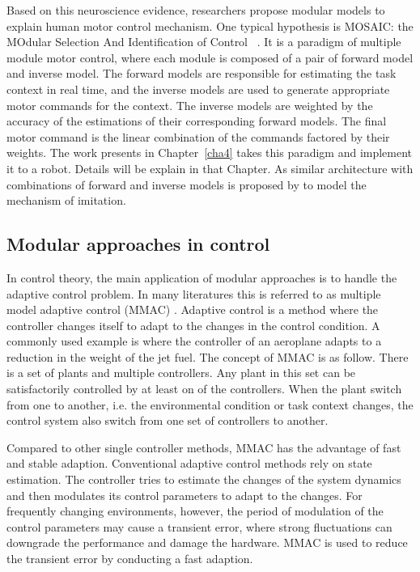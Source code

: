 Based on this neuroscience evidence, researchers propose modular models to explain human motor control mechanism. One typical hypothesis is MOSAIC: the MOdular Selection And Identification of Control ~\citep{haruno2001mosaic}. It is a paradigm of multiple module motor control, where each module is composed of a pair of forward model and inverse model. The forward models are responsible for estimating the task context in real time, and the inverse models are used to generate appropriate motor commands for the context. The inverse models are weighted by the accuracy of the estimations of their corresponding forward models. The final motor command is the linear combination of the commands factored by their weights. The work presents in Chapter~\ref{cha4} takes this paradigm and implement it to a robot. Details will be explain in that Chapter. As similar architecture with combinations of forward and inverse models is proposed by \citet{demiris2002f} to model the mechanism of imitation.



\subsection{Modular approaches in control}
\label{cha2:sec3:control}

In control theory, the main application of modular approaches is to handle the adaptive control problem. In many literatures this is referred to as multiple model adaptive control (MMAC) \citep{athans1977stochastic,narendra1994improving,petkos2006learning}. Adaptive control is a method where the controller changes itself to adapt to the changes in the control condition. A commonly used example is where the controller of an aeroplane adapts to a reduction in the weight of the jet fuel. The concept of MMAC is as follow. There is a set of plants and multiple controllers. Any plant in this set can be satisfactorily controlled by at least on of the controllers. When the plant switch from one to another, i.e. the environmental condition or task context changes, the control system also switch from one set of controllers to another.


Compared to other single controller methods, MMAC has the advantage of fast and stable adaption.
Conventional adaptive control methods rely on state estimation. The controller tries to estimate the changes of the system dynamics and then modulates its control parameters to adapt to the changes. For frequently changing environments, however, the period of modulation of the control parameters may cause a transient error, where strong fluctuations can downgrade the performance and damage the hardware. MMAC is used to reduce the transient error by conducting a fast adaption.

